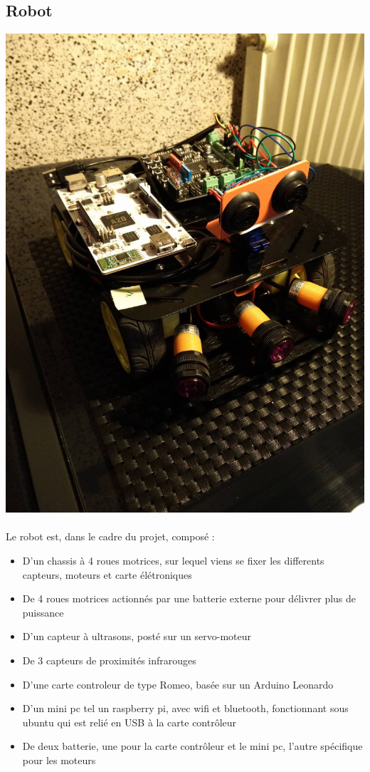 \documentclass[a4paper]{article}
\begin{document}
\subsection{Robot}

\begin{center}
\includegraphics[scale=0.15]{img/robot.jpg}
\end{center}

\paragraph{}
Le robot est, dans le cadre du projet, composé :
\begin{itemize}
\item D'un chassis à 4 roues motrices, sur lequel viens se fixer les differents capteurs, moteurs et carte élétroniques
\item De 4 roues motrices actionnés par une batterie externe pour délivrer plus de puissance
\item D'un capteur à ultrasons, posté sur un servo-moteur
\item De 3 capteurs de proximités infrarouges
\item D'une carte controleur de type Romeo, basée sur un Arduino Leonardo
\item D'un mini pc tel un raspberry pi, avec wifi et bluetooth, fonctionnant sous ubuntu qui est relié en USB à la carte contrôleur
\item De deux batterie, une pour la carte contrôleur et le mini pc, l'autre spécifique pour les moteurs
\end{itemize}
\end{document}
